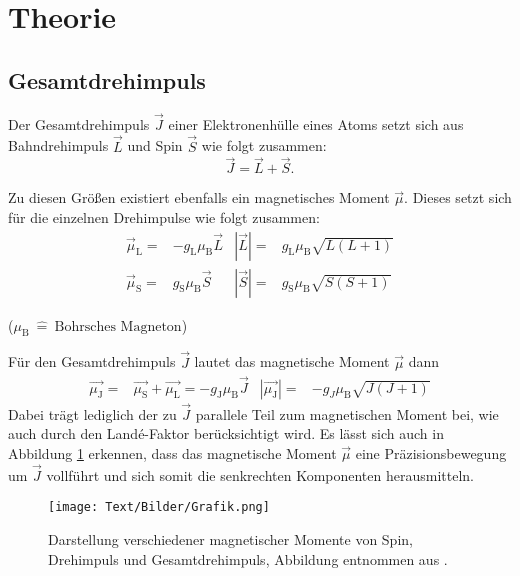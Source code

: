 \section{Theorie}

\subsection{Gesamtdrehimpuls}
Der Gesamtdrehimpuls $\vec{J}$ einer Elektronenhülle eines Atoms setzt sich aus Bahndrehimpuls $\vec{L}$ und Spin $\vec{S}$ wie folgt zusammen:
\begin{equation}
  \vec{J} = \vec{L} + \vec{S} \text{.}
\end{equation}

Zu diesen Größen existiert ebenfalls ein magnetisches Moment $\vec{\mu}$. Dieses setzt sich für die einzelnen Drehimpulse wie folgt zusammen:
\begin{align}
  \vec{\mu}_\text{L} =& - g_\text{L} \mu_\text{B} \vec{L} & \left| \vec{L} \right| =& g_\text{L} \mu_\text{B} \sqrt{L \left( L + 1 \right)} \label{eq:L} \\
  \vec{\mu}_\text{S} =& g_\text{S} \mu_\text{B} \vec{S} & \left| \vec{S} \right| =&  g_\text{S} \mu_\text{B} \sqrt{S \left( S + 1 \right)} \label{eq:S}
\end{align}

\begin{center}
  \tiny {($ \mu_\text{B} \: \hat{=} \: \text{Bohrsches Magneton}$)}
\end{center}

Für den Gesamtdrehimpuls $\vec{J}$ lautet das magnetische Moment $\vec{\mu}$ dann
\begin{align}
  \vec{\mu_\text{J}} =& \vec{\mu_\text{S}} + \vec{\mu_\text{L}} = -g_\text{J} \mu_\text{B} \vec{J} & \left| \vec{\mu_\text{J}} \right| =& -g_{J} \mu_\text{B} \sqrt{J \left( J + 1 \right)}
\end{align}
Dabei trägt lediglich der zu $\vec{J}$ parallele Teil zum magnetischen Moment bei, wie auch durch den Land\'{e}-Faktor berücksichtigt wird. Es lässt sich auch in Abbildung \ref{fig:mu-J} erkennen, dass das magnetische Moment $\vec{\mu}$ eine Präzisionsbewegung um $\vec{J}$ vollführt und sich somit die senkrechten Komponenten herausmitteln.

\begin{figure}
  \centering
  \texttt{[image: Text/Bilder/Grafik.png]}
  \caption{Darstellung verschiedener magnetischer Momente von Spin, Drehimpuls und Gesamtdrehimpuls, Abbildung entnommen aus \cite[225]{buch}.}
  \label{fig:mu-J}
\end{figure}

